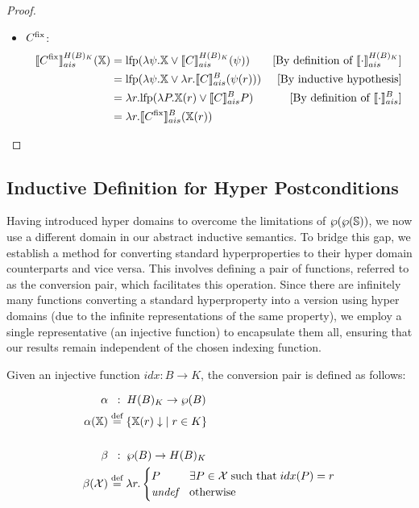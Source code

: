 \documentclass[
  10pt,       %
  twoside,    %
  a4paper,    %
  english,    %
  tikz,       %
  openright,  %
]{book}
\begin{document}
\begin{proof}
\begin{itemize}
    \item $C^\fix$:
      \begin{align*}
        \asem[H(B)_K]{C^\fix}(\chi)
          &= \lfp(\lambda \psi . \chi \lor \asem[H(B)_K]{C}(\psi))
          &\text{[By definition of $\asem[H(B)_K]{\cdot}$]} \\
          &= \lfp(\lambda \psi . \chi \lor \lambda r . \asem[B]{C}(\psi(r)))
          &\text{[By inductive hypothesis]} \\
          &= \lambda r . \lfp(\lambda P . \chi(r) \lor \asem[B]{C} P)
          &\text{[By definition of $\asem[B]{\cdot}$]} \\
          &= \lambda r . \asem[B]{C^\fix}(\chi(r))
      \end{align*}
  \end{itemize}
\end{proof}


\subsection{Inductive Definition for Hyper Postconditions}

Having introduced hyper domains to overcome the limitations of
$\pow{\pow{\states}}$, we now use a different domain in our abstract inductive
semantics. To bridge this gap, we establish a method for converting standard
hyperproperties to their hyper domain counterparts and vice versa. This
involves defining a pair of functions, referred to as the conversion pair,
which facilitates this operation. Since there are infinitely many functions
converting a standard hyperproperty into a version using hyper domains (due to
the infinite representations of the same property), we employ a single
representative (an injective function) to encapsulate them all, ensuring that
our results remain independent of the chosen indexing function.

\begin{definition}
  Given an injective function $idx : B \to K$, the conversion pair is defined
  as follows:

  \begin{align*}
    \alpha &\;\;:\; H(B)_K \to \pow{B} \\
    \alpha(\chi) &\defeq \{ \chi(r) \downarrow \; \mid r \in K \} \\
    \\
    \beta &\;\;:\; \pow{B} \to H(B)_K \\
    \beta(\mathcal{X}) &\defeq \lambda r . \begin{cases}
      P              & \exists P \in \mathcal{X} \; \text{such that} \; idx(P) = r \\
      \textit{undef} & \text{otherwise}
    \end{cases}
  \end{align*}
\end{definition}
\end{document}
